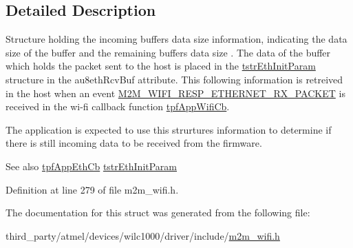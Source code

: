 \subsection{Detailed Description}
Structure holding the incoming buffer\textquotesingle{}s data size information, indicating the data size of the buffer and the remaining buffer\textquotesingle{}s data size . The data of the buffer which holds the packet sent to the host is placed in the \hyperlink{structtstrEthInitParam}{tstr\+Eth\+Init\+Param} structure in the au8eth\+Rcv\+Buf attribute. This following information is retreived in the host when an event \hyperlink{group__WlanEnums_gga064de09dec1d5e88ed8d075fa40f57dea2d2336ccd8bfda6e083b0ec6b8d798ba}{M2\+M\+\_\+\+W\+I\+F\+I\+\_\+\+R\+E\+S\+P\+\_\+\+E\+T\+H\+E\+R\+N\+E\+T\+\_\+\+R\+X\+\_\+\+P\+A\+C\+K\+ET} is received in the wi-\/fi callback function \hyperlink{group__WlanEnums_gac5302f32839285fe8375c159087aa8a1}{tpf\+App\+Wifi\+Cb}. 

The application is expected to use this strurture\textquotesingle{}s information to determine if there is still incoming data to be received from the firmware.

\begin{DoxySeeAlso}{See also}
\hyperlink{group__WlanEnums_ga9dda38bbac67906396ad1b1e0419502d}{tpf\+App\+Eth\+Cb} \hyperlink{structtstrEthInitParam}{tstr\+Eth\+Init\+Param} 
\end{DoxySeeAlso}


Definition at line 279 of file m2m\+\_\+wifi.\+h.



The documentation for this struct was generated from the following file\+:\begin{DoxyCompactItemize}
\item 
third\+\_\+party/atmel/devices/wilc1000/driver/include/\hyperlink{m2m__wifi_8h}{m2m\+\_\+wifi.\+h}\end{DoxyCompactItemize}
